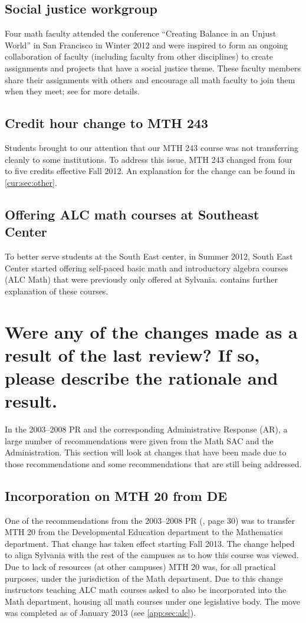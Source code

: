 \subsection{Social justice workgroup} Four math faculty attended the conference
``Creating Balance in an Unjust World'' in San Francisco in Winter 2012
and were inspired to form an ongoing collaboration of faculty (including faculty from other disciplines) to create
assignments and projects that have a social justice theme.  These faculty
members share their assignments with others and encourage all math faculty
to join them when they meet; see  for
more details.
\subsection{Credit hour change to MTH 243} Students brought to our attention that our
MTH 243 course was not transferring cleanly to some institutions.  To
address this issue, MTH 243 changed from four to five credits effective Fall
2012.  An explanation for the change can be found in \vref{cur:sec:other}.
\subsection{Offering ALC math courses at Southeast Center} To better serve students at the South
East center, in Summer 2012, South East Center started offering
self-paced basic math and introductory algebra courses (ALC Math) that were previously only offered at
Sylvania. 
contains further explanation of these courses.

\section[Changes resulting from the last program review]{Were any of the changes
 made as a result of the last review? If so,
 please describe the rationale and result.}\label{over:sec:changesresult}

In the 2003--2008 PR and the corresponding Administrative
Response (AR), a large number of recommendations were given from the Math SAC and
the Administration.  This section will look at changes that have been made due
to those recommendations and some recommendations that are still being
addressed.

\subsection{Incorporation on MTH 20 from DE}
One of the recommendations from the 2003--2008 PR (\cite{mathprogramreview2003}, page 30) was to transfer MTH
20 from the Developmental Education department to the Mathematics department.
That change has taken effect starting Fall 2013.  The change helped to align
Sylvania with the rest of the campuses as to how this course was viewed.   Due
to lack of resources (at other campuses) MTH 20 was, for all practical purposes,
under the jurisdiction of the Math department.  Due to this change instructors
teaching ALC math courses asked to also be incorporated into the Math
department, housing all math courses under one legislative body.  The move was
completed as of January 2013 (see \vref{app:sec:alc}).


